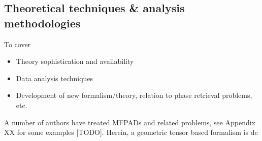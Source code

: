 \subsection{Theoretical techniques \& analysis methodologies}

To cover 

\begin{itemize}
\item Theory sophistication and availability
\item Data analysis techniques
\item Development of new formalism/theory, relation to phase retrieval problems, etc.
\end{itemize}

A number of authors have treated MFPADs and related problems, see Appendix XX for some examples [TODO]. Herein, a geometric tensor based formalism is de